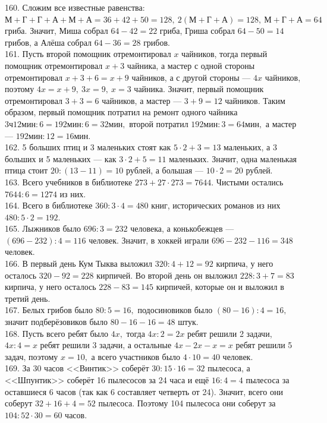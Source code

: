\documentclass[12pt]{article}
\begin{document}
160. Сложим все известные равенства: $\text{М}+\text{Г}+\text{Г}+\text{А}+\text{М}+\text{А}=36+42+50=128,\ 2(\text{М}+\text{Г}+\text{А})=128,\ \text{М}+\text{Г}+\text{А}=64$ гриба. Значит, Миша собрал $64-42=22$ гриба, Гриша собрал $64-50=14$ грибов, а Алёша собрал $64-36=28$ грибов.\\
161. Пусть второй помощник отремонтировал $x$ чайников, тогда первый помощник отремонтировал $x+3$ чайника, а мастер с одной стороны отремонтировал $x+3+6=x+9$ чайников, а с другой стороны --- $4x$ чайников, поэтому $4x=x+9,\ 3x=9,\ x=3$ чайника. Значит, первый помощник отремонтировал $3+3=6$ чайников, а мастер --- $3+9=12$ чайников. Таким образом, первый помощник потратил на ремонт одного чайника $3\text{ч}12\text{мин}:6=192\text{мин}:6=32\text{мин},$ второй потратил $192\text{мин}:3=64\text{мин},$ а мастер --- $192\text{мин}:12=16\text{мин}.$\\
162. 5 больших птиц и 3 маленьких стоят как $5\cdot2+3=13$ маленьких, а 3 больших и 5 маленьких --- как $3\cdot2+5=11$ маленьких. Значит, одна маленькая птица стоит $20:(13-11)=10$ рублей, а большая --- $10\cdot2=20$ рублей.\\
163. Всего учебников в библиотеке $273+27\cdot273=7644.$ Чистыми остались $7644:6=1274$ из них.\\
164. Всего в библиотеке $360:3\cdot4=480$ книг, исторических романов из них $480:5\cdot2=192.$\\
165. Лыжников было $696:3=232$ человека, а конькобежцев --- $(696-232):4=116$ человек. Значит, в хоккей играли $696-232-116=348$ человек.\\
166. В первый день Кум Тыква выложил $320:4+12=92$ кирпича, у него осталось $320-92=228$ кирпичей. Во второй день он выложил $228:3+7=83$ кирпича, у него осталось $228-83=145$ кирпичей, которые он и выложил в третий день.\\
167. Белых грибов было $80:5=16,$ подосиновиков было $(80-16):4=16,$ значит подберёзовиков было $80-16-16=48$ штук.\\
168. Пусть всего ребят было $4x,$ тогда $4x:2=2x$ ребят решили 2 задачи, $4x:4=x$ ребят решили 3 задачи, а остальные $4x-2x-x=x$ ребят решили 5 задач, поэтому $x=10,$ а всего участников было $4\cdot10=40$ человек.\\
169. За 30 часов <<Винтик>> соберёт $30:15\cdot16=32$ пылесоса, а <<Шпунтик>> соберёт 16 пылесосов за 24 часа и ещё $16:4=4$ пылесоса за оставшиеся 6 часов (так как 6 составляет четверть от 24). Значит, всего они соберут $32+16+4=52$ пылесоса. Поэтому 104 пылесоса они соберут за $104:52\cdot30=60$ часов.\\
\end{document}
